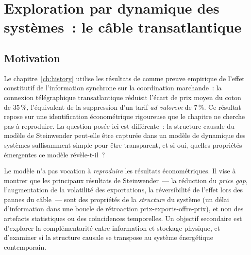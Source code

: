% 

\chapter{Exploration par dynamique des systèmes~: le câble transatlantique}\label{ch:annexe-sd}

\section{Motivation}

Le chapitre~\ref{ch:history} utilise les résultats de \textcite{steinwender_real_2018} comme preuve empirique de l'effet constitutif de l'information synchrone sur la coordination marchande~: la connexion télégraphique transatlantique réduisit l'écart de prix moyen du coton de 35\,\%, l'équivalent de la suppression d'un tarif \emph{ad valorem} de 7\,\%. Ce résultat repose sur une identification économétrique rigoureuse que le chapitre ne cherche pas à reproduire. La question posée ici est différente~: la structure causale du modèle de Steinwender peut-elle être capturée dans un modèle de dynamique des systèmes suffisamment simple pour être transparent, et si oui, quelles propriétés émergentes ce modèle révèle-t-il~?

Le modèle n'a pas vocation à \emph{reproduire} les résultats économétriques. Il vise à montrer que les principaux résultats de Steinwender~--- la réduction du \emph{price gap}, l'augmentation de la volatilité des exportations, la réversibilité de l'effet lors des pannes du câble~--- sont des propriétés de la \emph{structure} du système (un délai d'information dans une boucle de rétroaction prix-exports-offre-prix), et non des artefacts statistiques ou des coïncidences temporelles. Un objectif secondaire est d'explorer la complémentarité entre information et stockage physique, et d'examiner si la structure causale se transpose au système énergétique contemporain.


